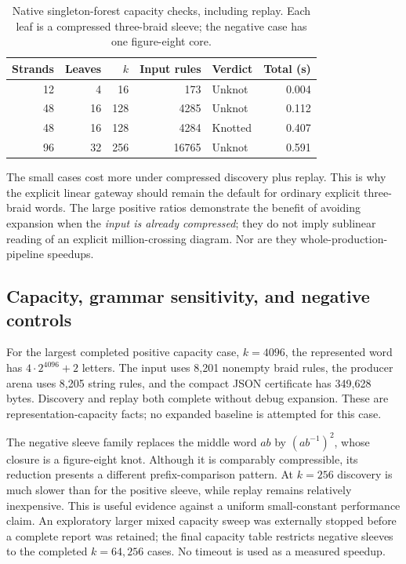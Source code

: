 \documentclass[11pt,letterpaper]{article}
\theoremstyle{definition}\newtheorem{definition}[theorem]{Definition}
\theoremstyle{remark}\newtheorem{remark}[theorem]{Remark}
\begin{document}
\begin{table}[htbp]
\centering\small
\begin{tabular}{@{}rrrrlr@{}}
\toprule
Strands & Leaves & $k$ & Input rules & Verdict & Total (s)\\
\midrule
12 & 4 & 16 & 173 & Unknot & 0.004\\
48 & 16 & 128 & 4285 & Unknot & 0.112\\
48 & 16 & 128 & 4284 & Knotted & 0.407\\
96 & 32 & 256 & 16765 & Unknot & 0.591\\
\bottomrule
\end{tabular}
\caption{Native singleton-forest capacity checks, including replay. Each leaf is a compressed three-braid sleeve; the negative case has one figure-eight core.}
\label{tab:forests}
\end{table}

The small cases cost more under compressed discovery plus replay. This is why the explicit linear gateway should remain the default for ordinary explicit three-braid words. The large positive ratios demonstrate the benefit of avoiding expansion when the \emph{input is already compressed}; they do not imply sublinear reading of an explicit million-crossing diagram. Nor are they whole-production-pipeline speedups.

\subsection{Capacity, grammar sensitivity, and negative controls}
For the largest completed positive capacity case, $k=4096$, the represented word has $4\cdot2^{4096}+2$ letters. The input uses 8,201 nonempty braid rules, the producer arena uses 8,205 string rules, and the compact JSON certificate has 349,628 bytes. Discovery and replay both complete without debug expansion. These are representation-capacity facts; no expanded baseline is attempted for this case.

The negative sleeve family replaces the middle word $ab$ by $(ab^{-1})^2$, whose closure is a figure-eight knot. Although it is comparably compressible, its reduction presents a different prefix-comparison pattern. At $k=256$ discovery is much slower than for the positive sleeve, while replay remains relatively inexpensive. This is useful evidence against a uniform small-constant performance claim. An exploratory larger mixed capacity sweep was externally stopped before a complete report was retained; the final capacity table restricts negative sleeves to the completed $k=64,256$ cases. No timeout is used as a measured speedup.
\end{document}
